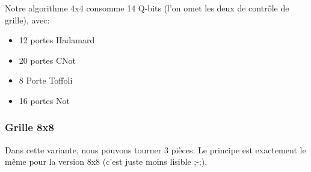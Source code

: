 \documentclass[12pt]{article}
\begin{document}
    Notre algorithme 4x4 consomme 14 Q-bits (l'on omet les deux de contrôle de grille), avec:
    \begin{itemize}
        \item 12 portes Hadamard
        \item 20 portes CNot
        \item 8 Porte Toffoli
        \item 16 portes Not
    \end{itemize}

    \newpage
    
    \subsubsection{Grille 8x8}

    
    Dans cette variante, nous pouvons tourner 3 pièces.
    Le principe est exactement le même pour la version 8x8 (c'est juste moins lisible ;-;).
\end{document}
